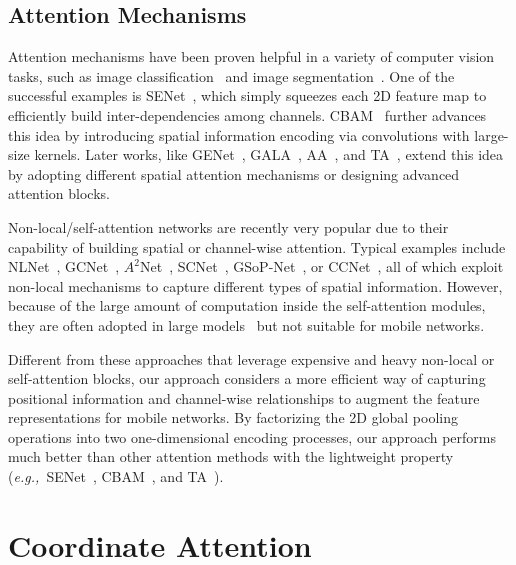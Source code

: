 \documentclass[final]{cvpr}
\def\eg{\emph{e.g.,~}}
\begin{document}
\subsection{Attention Mechanisms}

Attention mechanisms \cite{tsotsos1990analyzing,tsotsos2011computational} have been proven helpful in a variety of computer vision tasks, such as image classification~\cite{hu2018squeeze,hu2018gather,woo2018cbam,bello2019attention} and image segmentation~\cite{hou2020strip,huang2018ccnet,fu2019dual}.
%
One of the successful examples is SENet~\cite{hu2018squeeze}, which simply squeezes each 2D feature map to efficiently build inter-dependencies
among channels.
%
CBAM~\cite{woo2018cbam} further advances this idea by introducing spatial information encoding via
convolutions with large-size kernels.
%
Later works, like GENet~\cite{hu2018gather}, GALA~\cite{linsley2018global}, AA~\cite{bello2019attention}, and TA~\cite{misra2021rotate}, extend this idea by adopting different spatial attention mechanisms or designing advanced attention blocks.


Non-local/self-attention networks are recently very popular due to their capability of building spatial or channel-wise attention.
%
Typical examples include  NLNet~\cite{wang2018non}, GCNet~\cite{cao2019gcnet}, $A^2$Net~\cite{chen20182}, SCNet~\cite{liu2020improving}, GSoP-Net~\cite{gao2019global}, or CCNet~\cite{huang2018ccnet}, all of which exploit non-local mechanisms to capture different types of spatial information.
%
However, because of the large amount of computation inside the self-attention modules, they are often adopted in large models~\cite{He2016,xie2017aggregated} but not suitable for mobile networks.


Different from these approaches that
leverage expensive and heavy non-local or self-attention blocks, our approach considers a more efficient way of capturing positional information and channel-wise relationships to augment the feature representations for mobile networks.
%
By factorizing the 2D global pooling operations into two one-dimensional encoding processes, our approach performs much better than other attention methods
with the lightweight property (\eg SENet~\cite{hu2018squeeze}, CBAM~\cite{woo2018cbam}, and TA~\cite{misra2021rotate}).


\section{Coordinate Attention} \label{sec:method}
\end{document}
